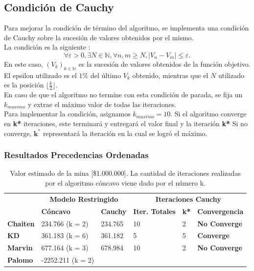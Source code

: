 \documentclass[12pt,letterpaper]{article}
\newcommand{\abs}[1]{\left| #1 \right|}
\begin{document}
\subsection{Condición de Cauchy}
Para mejorar la condición de término del algoritmo, se implementa una condición de Cauchy sobre la sucesión de valores obtenidos por el mismo.\\
La condición es la siguiente :
$$
\forall \varepsilon>0, \exists N \in \mathbb{N}, \forall n,m\geq N, \abs{V_n-V_m}\leq \varepsilon.
$$
En este caso, $(V_k)_{k\in\mathbb{N}}$ es la sucesión de valores obtenidos de la función objetivo. El epsilon utilizado es el $1\%$ del último $V_k$ obtenido, mientras que el $N$ utilizado es la posición $\lfloor \frac{k}{2} \rfloor$.\\
En caso de que el algoritmo no termine con esta condición de parada, se fija un $k_{maximo}$ y extrae el máximo valor de todas las iteraciones.\\

Para implementar la condición, asignamos $k_{maximo}=10$. Si el algoritmo converge en \textbf{k*} iteraciones, este terminará y entregará el valor final y la iteración \textbf{k*}
Si no converge, $\mathbf{k^*}$ representará la iteración en la cual se logró el máximo.

\subsubsection{Resultados Precedencias Ordenadas}

\begin{table}[H]
\centering
\begin{tabular}{|l|ll|lll|}
\hline
                 & \multicolumn{2}{c|}{\textbf{Modelo Restringido}} & \multicolumn{3}{c|}{\textbf{Iteraciones Cauchy}}                   \\ \cline{2-6} 
                 & \textbf{Cóncavo}         & \textbf{Cauchy}       & \textbf{Iter. Totales} & \textbf{k*} & \textbf{Convergencia} \\ \hline
\textbf{Chaiten} & 234.766 (k = 2)          & 234.765               & 10                           & 2           & \textbf{No Converge}           \\ \hline
\textbf{KD}      & 361.183 (k = 6)          & 361.182               & 5                            & 5           & \textbf{Converge}              \\ \hline
\textbf{Marvin}  & 677.164 (k = 3)          & 678.984               & 10                           & 2           & \textbf{No Converge}           \\ \hline
\textbf{Palomo}  & -2252.211 (k = 2)        &                       &                              &             &                       \\ \hline
\end{tabular}
\caption{Valor estimado de la mina [\$1.000.000]. La cantidad de iteraciones realizadas por el algoritmo cóncavo viene dado por el número k.}
\end{table}
\end{document}
